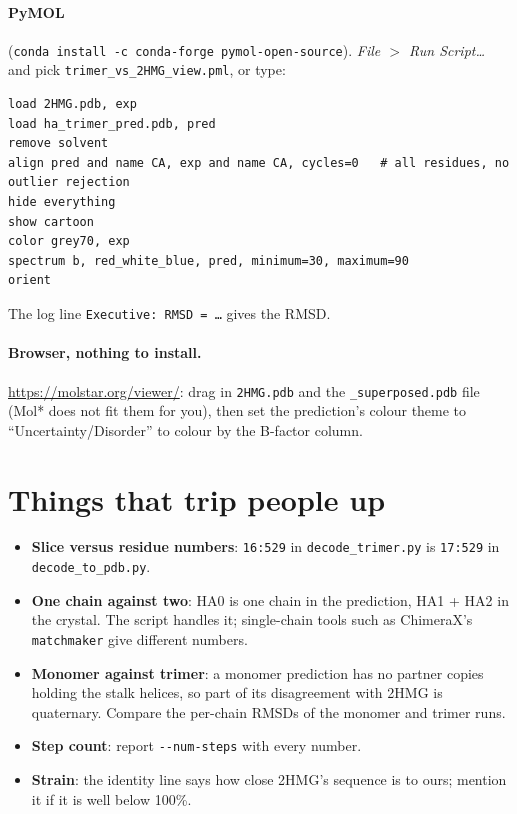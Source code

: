 \documentclass[11pt,a4paper]{article}
\newcommand{\file}[1]{\texttt{#1}}
\begin{document}
\paragraph{PyMOL} (\file{conda install -c conda-forge pymol-open-source}).
\emph{File $>$ Run Script\ldots} and pick \file{trimer\_vs\_2HMG\_view.pml}, or
type:
\begin{lstlisting}
load 2HMG.pdb, exp
load ha_trimer_pred.pdb, pred
remove solvent
align pred and name CA, exp and name CA, cycles=0   # all residues, no outlier rejection
hide everything
show cartoon
color grey70, exp
spectrum b, red_white_blue, pred, minimum=30, maximum=90
orient
\end{lstlisting}
The log line \file{Executive: RMSD = \ldots} gives the RMSD.

\paragraph{Browser, nothing to install.} \url{https://molstar.org/viewer/}: drag
in \file{2HMG.pdb} and the \file{\_superposed.pdb} file (Mol* does not fit them
for you), then set the prediction's colour theme to ``Uncertainty/Disorder''
to colour by the B-factor column.

\section{Things that trip people up}
\begin{itemize}
  \item \textbf{Slice versus residue numbers}: \file{16:529} in
        \file{decode\_trimer.py} is \file{17:529} in \file{decode\_to\_pdb.py}.
  \item \textbf{One chain against two}: HA0 is one chain in the prediction, HA1 +
        HA2 in the crystal. The script handles it; single-chain tools such as
        ChimeraX's \file{matchmaker} give different numbers.
  \item \textbf{Monomer against trimer}: a monomer prediction has no partner
        copies holding the stalk helices, so part of its disagreement with 2HMG is
        quaternary. Compare the per-chain RMSDs of the monomer and trimer runs.
  \item \textbf{Step count}: report \file{-{}-num-steps} with every number.
  \item \textbf{Strain}: the identity line says how close 2HMG's sequence is to
        ours; mention it if it is well below 100\%.
\end{itemize}
\end{document}
